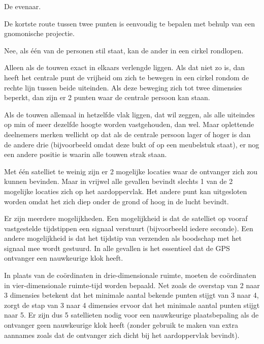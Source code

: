 \begin{Antwoord}{2.14}
		De evenaar.
	
\end{Antwoord}
\begin{Antwoord}{2.15}
		De kortste route tussen twee punten is eenvoudig te bepalen met behulp van een gnomonische projectie.
	
\end{Antwoord}
\begin{Antwoord}{4.1}
		Nee, als \'e\'en van de personen stil staat, kan de ander in een cirkel rondlopen.
	
\end{Antwoord}
\begin{Antwoord}{4.2}
		Alleen als de touwen exact in elkaars verlengde liggen. Als dat niet zo is, dan heeft het centrale punt de vrijheid om zich te bewegen in een cirkel rondom de rechte lijn tussen beide uiteinden. Als deze beweging zich tot twee dimensies beperkt, dan zijn er 2 punten waar de centrale persoon kan staan.
	
\end{Antwoord}
\begin{Antwoord}{4.3}
		Als de touwen allemaal in hetzelfde vlak liggen, dat wil zeggen, als alle uiteindes op min of meer dezelfde hoogte worden 	vastgehouden, dan wel. Maar oplettende deelnemers merken wellicht op dat als de centrale persoon lager of hoger is dan de 			andere drie (bijvoorbeeld omdat deze bukt of op een meubelstuk staat), er nog een andere positie is waarin alle touwen 				strak staan.
	
\end{Antwoord}
\begin{Antwoord}{4.11}
		Met \'e\'en satelliet te weinig zijn er 2 mogelijke locaties waar de ontvanger zich zou kunnen bevinden. Maar in vrijwel alle gevallen bevindt slechts 1 van de 2 mogelijke locaties zich op het aardoppervlak. Het andere punt kan uitgesloten worden omdat het zich diep onder de grond of hoog in de lucht bevindt.
	
\end{Antwoord}
\begin{Antwoord}{4.13}
		Er zijn meerdere mogelijkheden. Een mogelijkheid is dat de satelliet op vooraf vastgestelde tijdstippen een signaal verstuurt (bijvoorbeeld iedere seconde). Een andere mogelijkheid is dat het tijdstip van verzenden als boodschap met het signaal mee wordt gestuurd. In alle gevallen is het essentieel dat de GPS ontvanger een nauwkeurige klok heeft.
	
\end{Antwoord}
\begin{Antwoord}{4.15}
		In plaats van de co\"ordinaten in drie-dimensionale ruimte, moeten de co\"ordinaten in vier-dimensionale ruimte-tijd worden bepaald. Net zoals de overstap van 2 naar 3 dimensies betekent dat het minimale aantal bekende punten stijgt van 3 naar 4, zorgt de stap van 3 naar 4 dimensies ervoor dat het minimale aantal punten stijgt naar 5. Er zijn dus 5 satellieten nodig voor een nauwkeurige plaatsbepaling als de ontvanger geen nauwkeurige klok heeft (zonder gebruik te maken van extra aannames zoals dat de ontvanger zich dicht bij het aardoppervlak bevindt).
	
\end{Antwoord}

